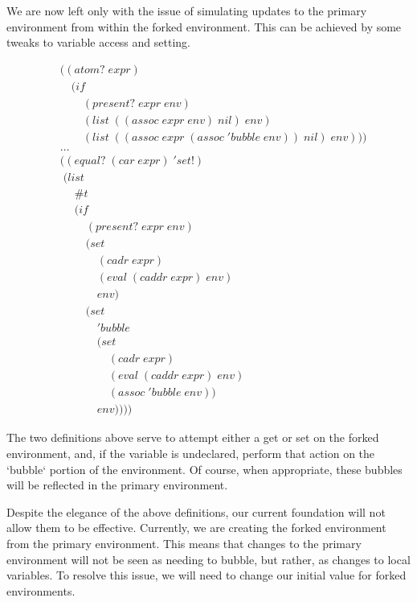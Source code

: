 We are now left only with the issue of simulating updates to the primary
environment from within the forked environment. This can be achieved by some
tweaks to variable access and setting.

\begin{align*}
& ((atom? \; expr) \; 
\\& \quad (if
\\& \qquad (present? \; expr \; env)
\\& \qquad (list \; ((assoc \; expr \; env) \; nil) \; env)
\\& \qquad (list \; ((assoc \; expr \; (assoc \; 'bubble \; env)) \; nil) \; env)))
\\& \dots \; 
\\& ((equal? \; (car \; expr) \; 'set!)
\\& \; (list \; 
\\& \quad \; \#t \; 
\\& \quad \; (if
\\& \qquad \; (present? \; expr \; env)
\\& \qquad \; (set \; 
\\& \qquad \quad \; (cadr \; expr) \; 
\\& \qquad \quad \; (eval \; (caddr \; expr) \; env) \; 
\\& \qquad \quad \; env)
\\& \qquad \; (set
\\& \qquad \quad \; 'bubble
\\& \qquad \quad \; (set
\\& \qquad \qquad \; (cadr \; expr)
\\& \qquad \qquad \; (eval \; (caddr \; expr) \; env)
\\& \qquad \qquad \; (assoc \; 'bubble \; env))
\\& \qquad \quad \; env)))) \; 
\end{align*}

The two definitions above serve to attempt either a get or set on the forked
environment, and, if the variable is undeclared, perform that action on the
`bubble` portion of the environment. Of course, when appropriate, these 
bubbles will be reflected in the primary environment.

Despite the elegance of the above definitions, our current foundation will
not allow them to be effective. Currently, we are creating the forked
environment from the primary environment. This means that changes to the
primary environment will not be seen as needing to bubble, but rather, as 
changes to local variables. To resolve this issue, we will need to change our
initial value for forked environments.

